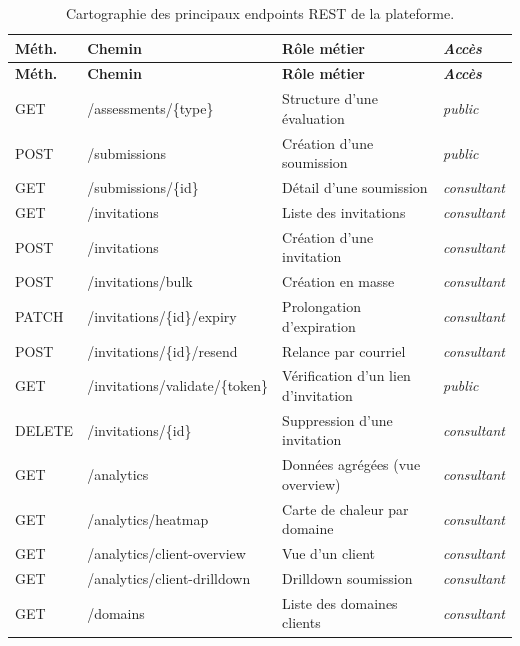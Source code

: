 \documentclass[12pt,a4paper]{report}
\begin{document}
\begin{longtable}{>{\ttfamily\small}L{1.4cm} >{\ttfamily\small}L{5.8cm} L{5.0cm} >{\itshape\footnotesize}L{2.0cm}}
\caption{Cartographie des principaux endpoints REST de la plateforme.}
\label{tab:endpoints}\\
\toprule
\textbf{Méth.} & \textbf{Chemin} & \textbf{Rôle métier} & \textbf{Accès} \\
\midrule
\endfirsthead
\toprule
\textbf{Méth.} & \textbf{Chemin} & \textbf{Rôle métier} & \textbf{Accès} \\
\midrule
\endhead
GET    & /assessments/\{type\}              & Structure d'une évaluation               & public \\
POST   & /submissions                        & Création d'une soumission                & public \\
GET    & /submissions/\{id\}                 & Détail d'une soumission                  & consultant \\
GET    & /invitations                        & Liste des invitations                    & consultant \\
POST   & /invitations                        & Création d'une invitation                & consultant \\
POST   & /invitations/bulk                   & Création en masse                        & consultant \\
PATCH  & /invitations/\{id\}/expiry          & Prolongation d'expiration                & consultant \\
POST   & /invitations/\{id\}/resend          & Relance par courriel                     & consultant \\
GET    & /invitations/validate/\{token\}     & Vérification d'un lien d'invitation      & public \\
DELETE & /invitations/\{id\}                 & Suppression d'une invitation             & consultant \\
GET    & /analytics                          & Données agrégées (vue overview)          & consultant \\
GET    & /analytics/heatmap                  & Carte de chaleur par domaine             & consultant \\
GET    & /analytics/client-overview          & Vue d'un client                          & consultant \\
GET    & /analytics/client-drilldown         & Drilldown soumission                     & consultant \\
GET    & /domains                            & Liste des domaines clients               & consultant \\

\end{longtable}
\end{document}

